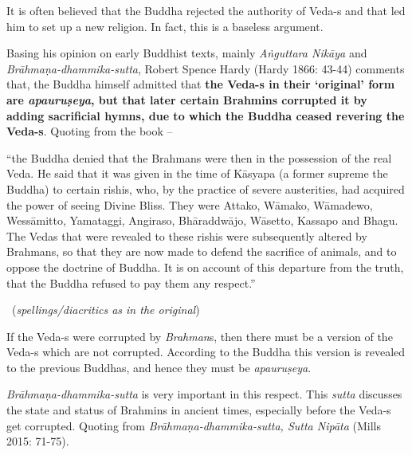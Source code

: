 It is often believed that the Buddha rejected the authority of Veda-s and that led him to set up a new religion. In fact, this is a baseless argument.

Basing his opinion on early Buddhist texts, mainly \textit{Aṅguttara Nikāya} and \textit{Brāhmaṇa-dhammika-sutta}, Robert Spence Hardy (Hardy 1866: 43-44) comments that, the Buddha himself admitted that \textbf{the Veda-s in their ‘original’ form are \textit{apauruṣeya}, but that later certain Brahmins corrupted it by adding sacrificial hymns, due to which the Buddha ceased revering the Veda-s}. Quoting from the book –

\begin{myquote}
“the Buddha denied that the Brahmans were then in the possession of the real Veda. He said that it was given in the time of Kāsyapa (a former supreme the Buddha) to certain rishis, who, by the practice of severe austerities, had acquired the power of seeing Divine Bliss. They were Attako, Wāmako, Wāmadewo, Wessāmitto, Yamataggi, Angiraso, Bhāraddwājo, Wāsetto, Kassapo and Bhagu. The Vedas that were revealed to these rishis were subsequently altered by Brahmans, so that they are now made to defend the sacrifice of animals, and to oppose the doctrine of Buddha. It is on account of this departure from the truth, that the Buddha refused to pay them any respect.” 

~\hfill (\textit{spellings/diacritics as in the original})
\end{myquote}

If the Veda-s were corrupted by \textit{Brahman}s, then there must be a version of the Veda-s which are not corrupted. According to the Buddha this version is revealed to the previous Buddhas, and hence they must be \textit{apauruṣeya}.

\textit{Brāhmaṇa-dhammika-sutta} is very important in this respect. This \textit{sutta} discusses the state and status of Brahmins in ancient times, especially before the Veda-s get corrupted. Quoting from \textit{Brāhmaṇa-dhammika-sutta, Sutta Nipāta} (Mills 2015: 71-75).

